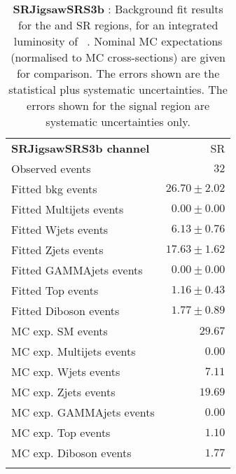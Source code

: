 

\begin{table}
\begin{center}
\setlength{\tabcolsep}{0.0pc}
{\tiny
\begin{tabular*}{\textwidth}{@{\extracolsep{\fill}}lr}
\noalign{\smallskip}\hline\noalign{\smallskip}
{\bf SRJigsawSRS3b channel}           & SR              \\[-0.05cm]
\noalign{\smallskip}\hline\noalign{\smallskip}
Observed events          & $32$                    \\
\noalign{\smallskip}\hline\noalign{\smallskip}
Fitted bkg events         & $26.70 \pm 2.02$              \\
\noalign{\smallskip}\hline\noalign{\smallskip}
        Fitted Multijets events         & $0.00 \pm 0.00$              \\
        Fitted Wjets events         & $6.13 \pm 0.76$              \\
        Fitted Zjets events         & $17.63 \pm 1.62$              \\
        Fitted GAMMAjets events         & $0.00 \pm 0.00$              \\
        Fitted Top events         & $1.16 \pm 0.43$              \\
        Fitted Diboson events         & $1.77 \pm 0.89$              \\
 \noalign{\smallskip}\hline\noalign{\smallskip}
MC exp. SM events              & $29.67$              \\
\noalign{\smallskip}\hline\noalign{\smallskip}
        MC exp. Multijets events         & $0.00$              \\
        MC exp. Wjets events         & $7.11$              \\
        MC exp. Zjets events         & $19.69$              \\
        MC exp. GAMMAjets events         & $0.00$              \\
        MC exp. Top events         & $1.10$              \\
        MC exp. Diboson events         & $1.77$              \\
\noalign{\smallskip}\hline\noalign{\smallskip}
\end{tabular*}
}
\end{center}
\caption{{\bf SRJigsawSRS3b} : Background fit results for the  and SR regions, for an integrated luminosity of \ourintlumi~\ifb. Nominal MC expectations (normalised to MC cross-sections) are given for comparison. The errors shown are the statistical plus systematic uncertainties. The errors shown for the signal region are systematic uncertainties only.}
\label{table.results.systematics.in.logL.fit.SR.SRJigsawSRS3b}
\end{table}
%